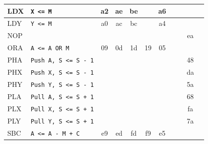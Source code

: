 \documentclass[
	12pt,				  %
	openright,		%
	a4paper,			%
	english,			%
	french,				%
	spanish,			%
	brazil,				%
]{abntex2}
\newcommand{\codenobg}[1]{\texttt{#1}}
\begin{document}
\begin{figure}
\begin{longtable}{|l|p{4cm}|c|c|c|c|c|c|c|c|c|}
		LDX                & \codenobg{X <= M}             & a2          & ae            & be            &              & a6          &                &            &               &              \\ \hline
		LDY                & \codenobg{Y <= M}             & a0          & ac            & bc            &              & a4          &                &            &               &              \\ \hline
		NOP                &                               &             &               &               &              &             &                &            & ea            &              \\ \hline
		ORA                & \codenobg{A <= A OR M}        & 09          & 0d            & 1d            & 19           & 05          &                &            &               &              \\ \hline
		PHA                & \codenobg{Push A, S <= S - 1} &             &               &               &              &             &                &            & 48            &              \\ \hline
		PHX                & \codenobg{Push X, S <= S - 1} &             &               &               &              &             &                &            & da            &              \\ \hline
		PHY                & \codenobg{Push Y, S <= S - 1} &             &               &               &              &             &                &            & 5a            &              \\ \hline
		PLA                & \codenobg{Pull A, S <= S + 1} &             &               &               &              &             &                &            & 68            &              \\ \hline
		PLX                & \codenobg{Pull X, S <= S + 1} &             &               &               &              &             &                &            & fa            &              \\ \hline
		PLY                & \codenobg{Pull Y, S <= S + 1} &             &               &               &              &             &                &            & 7a            &              \\ \hline
		SBC                & \codenobg{A <= A - M + C}     & e9          & ed            & fd            & f9           & e5          &                &            &               &              \\ \hline

\end{longtable}
\end{figure}
\end{document}
